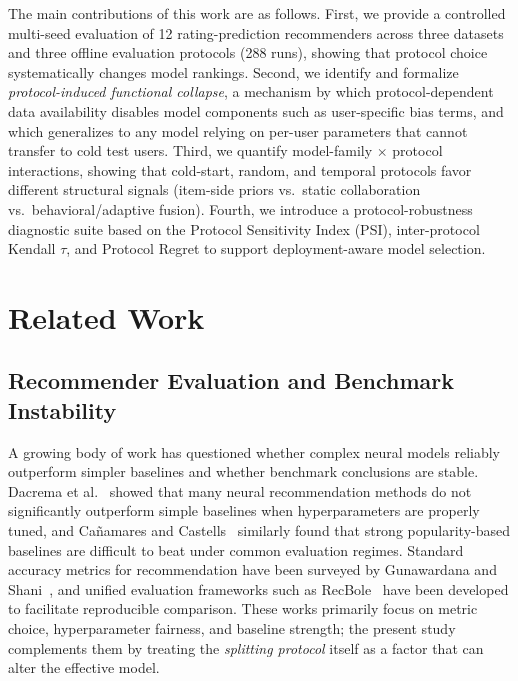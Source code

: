 \documentclass[journal]{IEEEtran}
\begin{document}
The main contributions of this work are as follows. First, we provide a controlled multi-seed evaluation of 12 rating-prediction recommenders across three datasets and three offline evaluation protocols (288 runs), showing that protocol choice systematically changes model rankings. Second, we identify and formalize \emph{protocol-induced functional collapse}, a mechanism by which protocol-dependent data availability disables model components such as user-specific bias terms, and which generalizes to any model relying on per-user parameters that cannot transfer to cold test users. Third, we quantify model-family $\times$ protocol interactions, showing that cold-start, random, and temporal protocols favor different structural signals (item-side priors vs.\ static collaboration vs.\ behavioral/adaptive fusion). Fourth, we introduce a protocol-robustness diagnostic suite based on the Protocol Sensitivity Index (PSI), inter-protocol Kendall $\tau$, and Protocol Regret to support deployment-aware model selection.

\section{Related Work}
\label{sec:related}

\subsection{Recommender Evaluation and Benchmark Instability}
A growing body of work has questioned whether complex neural models reliably outperform simpler baselines and whether benchmark conclusions are stable. Dacrema et al.~\cite{dacrema2019we,dacrema2021troubling} showed that many neural recommendation methods do not significantly outperform simple baselines when hyperparameters are properly tuned, and Ca{\~n}amares and Castells~\cite{canamares2018should} similarly found that strong popularity-based baselines are difficult to beat under common evaluation regimes. Standard accuracy metrics for recommendation have been surveyed by Gunawardana and Shani~\cite{gunawardana2009survey}, and unified evaluation frameworks such as RecBole~\cite{zhao2021recbole} have been developed to facilitate reproducible comparison. These works primarily focus on metric choice, hyperparameter fairness, and baseline strength; the present study complements them by treating the \emph{splitting protocol} itself as a factor that can alter the effective model.
\end{document}
